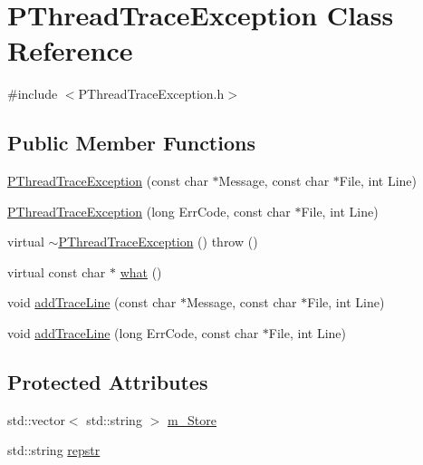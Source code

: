 \hypertarget{classPThreadTraceException}{\section{P\-Thread\-Trace\-Exception Class Reference}
\label{classPThreadTraceException}
}


{\ttfamily \#include $<$P\-Thread\-Trace\-Exception.\-h$>$}

\subsection*{Public Member Functions}
\begin{DoxyCompactItemize}
\item 
\hyperlink{classPThreadTraceException_aaf5e0e3209a7dd3164f86391ecad9197}{P\-Thread\-Trace\-Exception} (const char $\ast$Message, const char $\ast$File, int Line)
\item 
\hyperlink{classPThreadTraceException_a7eed7176fca13dcee841b94dc56d4986}{P\-Thread\-Trace\-Exception} (long Err\-Code, const char $\ast$File, int Line)
\item 
virtual \hyperlink{classPThreadTraceException_a6fd539fc33b8d2538d76445ad8ebc405}{$\sim$\-P\-Thread\-Trace\-Exception} ()  throw ()
\item 
virtual const char $\ast$ \hyperlink{classPThreadTraceException_a0f2cefad570dfca68455ac7b4a5dfbd4}{what} ()
\item 
void \hyperlink{classPThreadTraceException_ad875e2b4175057deaf2dfe4e24dce2e6}{add\-Trace\-Line} (const char $\ast$Message, const char $\ast$File, int Line)
\item 
void \hyperlink{classPThreadTraceException_a110da4a754734feb7def99ee01dcfc93}{add\-Trace\-Line} (long Err\-Code, const char $\ast$File, int Line)
\end{DoxyCompactItemize}
\subsection*{Protected Attributes}
\begin{DoxyCompactItemize}
\item 
std\-::vector$<$ std\-::string $>$ \hyperlink{classPThreadTraceException_a15692bd7f36282499cf4aac7cfab13b9}{m\-\_\-\-Store}
\item 
std\-::string \hyperlink{classPThreadTraceException_a5bd236044d0ef73ac6db56add023427a}{repstr}
\end{DoxyCompactItemize}


